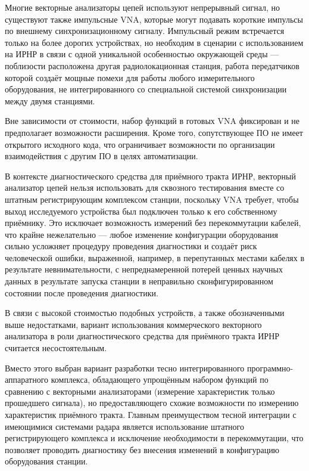 \documentclass{report}
\begin{document}
Многие векторные анализаторы цепей используют непрерывный сигнал, но существуют также импульсные VNA, которые могут подавать короткие импульсы по внешнему синхронизационному сигналу. Импульсный режим встречается только на более дорогих устройствах, но необходим в сценарии с использованием на ИРНР в связи с одной уникальной особенностью окружающей среды --- поблизости расположена другая радиолокационная станция, работа передатчиков которой создаёт мощные помехи для работы любого измерительного оборудования, не интегрированного со специальной системой синхронизации между двумя станциями.

Вне зависимости от стоимости, набор функций в готовых VNA фиксирован и не предполагает возможности расширения. Кроме того, сопутствующее ПО не имеет открытого исходного кода, что ограничивает возможности по организации взаимодействия с другим ПО в целях автоматизации.

В контексте диагностического средства для приёмного тракта ИРНР, векторный анализатор цепей нельзя использовать для сквозного тестирования вместе со штатным регистрирующим комплексом станции, поскольку VNA требует, чтобы выход исследуемого устройства был подключен только к его собственному приёмнику. Это исключает возможность измерений без перекоммутации кабелей, что крайне нежелательно --- любое изменение конфигурации оборудования сильно усложняет процедуру проведения диагностики и создаёт риск человеческой ошибки, выраженной, например, в перепутанных местами кабелях в результате невнимательности, с непреднамеренной потерей ценных научных данных в результате запуска станции в неправильно сконфигурированном состоянии после проведения диагностики.

В связи с высокой стоимостью подобных устройств, а также обозначенными выше недостатками, вариант использования коммерческого векторного анализатора в роли диагностического средства для приёмного тракта ИРНР считается несостоятельным.

Вместо этого выбран вариант разработки тесно интегрированного программно-аппаратного комплекса, обладающего упрощённым набором функций по сравнению с векторными анализаторами (измерение характеристик только прошедшего сигнала), но предоставляющего схожие возможности по измерению характеристик приёмного тракта. Главным преимуществом тесной интеграции с имеющимися системами радара является использование штатного регистрирующего комплекса и исключение необходимости в перекоммутации, что позволяет проводить диагностику без внесения изменений в конфигурацию оборудования станции.
\end{document}
